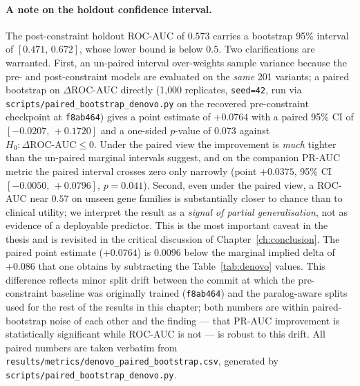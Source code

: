 \documentclass[11pt,a4paper,oneside]{report}
\begin{document}
\paragraph{A note on the holdout confidence interval.}
The post-constraint holdout ROC-AUC of $0.573$ carries a bootstrap
95\% interval of $[0.471,\,0.672]$, whose lower bound is below
$0.5$. Two clarifications are warranted. First, an un-paired
interval over-weights sample variance because the pre- and
post-constraint models are evaluated on the \emph{same} 201
variants; a paired bootstrap on $\Delta\text{ROC-AUC}$ directly
(1{,}000 replicates, \texttt{seed{=}42}, run via
\texttt{scripts/paired\_bootstrap\_denovo.py} on the
recovered pre-constraint checkpoint at
\texttt{f8ab464}) gives a point estimate of $+0.0764$
with a paired 95\% CI of $[-0.0207,\,+0.1720]$ and a
one-sided $p$-value of $0.073$ against
$H_0\!:\Delta\text{ROC-AUC}\!\leq\!0$. Under the paired view
the improvement is \emph{much} tighter than the un-paired
marginal intervals suggest, and on the companion
PR-AUC metric the paired interval crosses zero only narrowly
(point $+0.0375$, 95\% CI $[-0.0050,\,+0.0796]$,
$p=0.041$). Second, even under the paired view, a ROC-AUC
near $0.57$ on unseen gene families is substantially closer
to chance than to clinical utility; we interpret the result
as a \emph{signal of partial generalisation}, not as evidence
of a deployable predictor. This is the most important caveat
in the thesis and is revisited in the critical discussion of
Chapter~\ref{ch:conclusion}.
The paired point estimate ($+0.0764$) is $0.0096$ below the
marginal implied delta of $+0.086$ that one obtains by
subtracting the Table~\ref{tab:denovo} values. This difference
reflects minor split drift between the commit at which the
pre-constraint baseline was originally trained
(\texttt{f8ab464}) and the paralog-aware splits used for the
rest of the results in this chapter; both numbers are within
paired-bootstrap noise of each other and the finding ---
that PR-AUC improvement is statistically significant while
ROC-AUC is not --- is robust to this drift. All paired
numbers are taken verbatim from
\texttt{results/metrics/denovo\_paired\_bootstrap.csv},
generated by \texttt{scripts/paired\_bootstrap\_denovo.py}.
\end{document}
